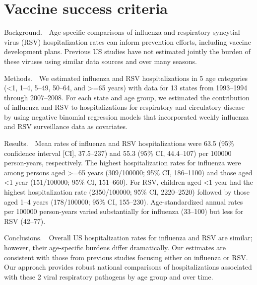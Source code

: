 \section{Vaccine success criteria}
\cite{zhouHospitalizationsAssociatedInfluenza2012}

Background. Age-specific comparisons of influenza and respiratory syncytial
virus (RSV) hospitalization rates can inform prevention efforts, including
vaccine development plans. Previous US studies have not estimated jointly the
burden of these viruses using similar data sources and over many seasons.

Methods. We estimated influenza and RSV hospitalizations in 5 age categories
(<1, 1–4, 5–49, 50–64, and >=65 years) with data for 13 states from 1993–1994
through 2007–2008. For each state and age group, we estimated the contribution
of influenza and RSV to hospitalizations for respiratory and circulatory
disease by using negative binomial regression models that incorporated weekly
influenza and RSV surveillance data as covariates.

Results. Mean rates of influenza and RSV hospitalizations were 63.5 (95\%
confidence interval [CI], 37.5–237) and 55.3 (95\% CI, 44.4–107) per 100000
person-years, respectively. The highest hospitalization rates for influenza
were among persons aged >=65 years (309/100000; 95\% CI, 186–1100) and those aged
<1 year (151/100000; 95\% CI, 151–660). For RSV, children aged <1 year had the
highest hospitalization rate (2350/100000; 95\% CI, 2220–2520) followed by those
aged 1–4 years (178/100000; 95\% CI, 155–230). Age-standardized annual rates per
100000 person-years varied substantially for influenza (33–100) but less for
RSV (42–77).

Conclusions. Overall US hospitalization rates for influenza and RSV are
similar; however, their age-specific burdens differ dramatically. Our estimates
are consistent with those from previous studies focusing either on influenza or
RSV. Our approach provides robust national comparisons of hospitalizations
associated with these 2 viral respiratory pathogens by age group and over time.





